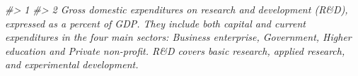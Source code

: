 \documentclass[
  xelatex, ja=standard]{bxjsbook}
\newenvironment{Shaded}{\begin{snugshade}}{\end{snugshade}}
\newcommand{\CommentTok}[1]{\textcolor[rgb]{0.56,0.35,0.01}{\textit{#1}}}
\theoremstyle{definition}
\theoremstyle{definition}
\theoremstyle{definition}
\theoremstyle{definition}
\theoremstyle{remark}
\begin{document}
\begin{Shaded}
\begin{Highlighting}[]
\CommentTok{\#\textgreater{} 1                                                                                                                                                                                                                                                                                                                                                                                                                                                                                                                                                                                                                                                                                                                                                                                                                                                                                                                                                                                                                                                                                                                                                                                                                                                                                                                                                                                                                                                   }
\CommentTok{\#\textgreater{} 2                                                                                                                                                                                                                                                                                                                                                                                                                                                                                                                                                                                                                                                                                                                                                                                                                                                                                                                                                                                                                                                                                                                    Gross domestic expenditures on research and development (R\&D), expressed as a percent of GDP. They include both capital and current expenditures in the four main sectors: Business enterprise, Government, Higher education and Private non{-}profit. R\&D covers basic research, applied research, and experimental development.}

\end{Highlighting}
\end{Shaded}
\end{document}

